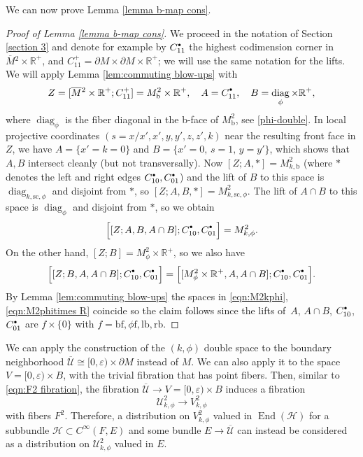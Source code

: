 \documentclass[JEP,XML,SOM,Unicode,NoFloatCountersInSection,published]{cedram}
\newcommand{\bbullet}{{\scriptscriptstyle\bullet}}
\newcommand{\sbullet}{{\raisebox{1pt}{$\bbullet$}}}
\theoremstyle{plain}
\theoremstyle{definition}
\newcommand{\R}{{\mathbb{R}}}
\newcommand{\Umath}{{\mathscr{U}}}
\newcommand{\Umathbar}{{\overline{\mathscr{U}}}}
\newcommand{\Hmath}{{\mathscr{H}}}
\newcommand{\phif}{{\phi\mathrm{f}}}
\newcommand{\lf}{{\mathrm{lb}}}
\newcommand{\rf}{{\mathrm{rb}}}
\newcommand{\bb}{{\mathrm{b}}}
\newcommand{\bbf}{{\mathrm{bf}}}
\newcommand{\ssc}{{\mathrm{sc}}}
\DeclareMathOperator\diag{diag}
\DeclareMathOperator{\End}{End}
\newcommand{\Cinf}{C^\infty}
\newcommand{\dM}{{\partial M}}
\newcommand{\Mbar}{{\overline{M}}}\let\M\Mbar
\let\eps\varepsilon
\begin{document}
We can now prove Lemma \ref{lemma b-map cons}.
\begin{proof} [Proof of Lemma \ref{lemma b-map cons}] We proceed in the notation of
Section \ref{section 3} and denote for example by $C_{11}^\sbullet$ the highest codimension corner in
$\Mbar{}^2 \times \R^+$, and $C_{11}^+ = \partial M\times\partial M\times \R^+$; we will use the same notation for the lifts.
We will apply
Lemma \ref{lem:commuting blow-ups} with
\[
Z=[\Mbar{}^2\times\R^+;C_{11}^+] = M^2_\bb\times\R^+, \quad
A=C_{11}^\sbullet, \quad B=\diag_\phi\times\R^+,
\]
where $\diag_\phi$ is the fiber diagonal in the b-face of $M^2_\bb$, see \eqref{phi-double}.
In local projective coordinates $(s=x/x', x', y,y',z,z',k)$ near the resulting front
face in $Z$, we have $A = \{x'=k=0\}$ and $B=\{x'=0,\, s=1,\, y=y'\}$, which shows that $A,B$ intersect cleanly {
(but not transversally).
Now $[Z;A,*]=M^2_{k,\bb}$ (where $*$ denotes the left and right edges $C_{10}^\sbullet,C_{01}^\sbullet$) and the lift of $B$ to this space is $\diag_{k,\ssc,\phi}$ and disjoint from $*$, so $[Z;A,B,*]= M^2_{k,\ssc,\phi}$. The lift of $A\cap B$ to this space is $\diag_\phi$ and disjoint from $*$, so we obtain}
\begin{equation}
\label{eqn:M2kphi}
\begin{split}
\Bigl[ [Z;A,B,A\cap B]; C_{10}^\sbullet,C_{01}^\sbullet\Bigr] = M^2_{k,\phi}.
\end{split}
\end{equation}
On the other hand, $[Z;B]=M^2_\phi\times\R^+$, so we also have
\begin{equation}
\label{eqn:M2phitimes R}
\Bigl[ [Z;B,A,A\cap B]; C_{10}^\sbullet,C_{01}^\sbullet\Bigr] = \Bigl[ [M^2_\phi \times \R^+,A,A\cap B]; C_{10}^\sbullet,C_{01}^\sbullet\Bigr].
\end{equation}
By Lemma \ref{lem:commuting blow-ups} the spaces in \eqref{eqn:M2kphi}, \eqref{eqn:M2phitimes R} coincide so the claim follows since the lifts of~$A$, $A\cap B$, $C_{10}^\sbullet$, $C_{01}^\sbullet$ are $f\times\{0\}$ with $f=\bbf, \phif, \lf,\rf$.
\end{proof}

We can apply the construction of the $(k,\phi)$ double space to the boundary neighborhood $\Umathbar\cong [0,\eps)\times\dM$ instead of $M$. We can also apply it to the space $V=[0,\eps)\times B$, with the trivial fibration that has point fibers. Then, similar to \eqref{eqn:F2 fibration}, the fibration $\Umathbar\to V=[0,\eps)\times B$ induces a fibration
\begin{equation}
\label{eqn:F2 fibration phi}
\Umath^2_{k,\phi} \to V^2_{k,\phi}
\end{equation}
with fibers $F^2$. Therefore, a distribution on $V^2_{k,\phi}$ valued in $\End(\Hmath)$ for a subbundle $\Hmath\subset \Cinf(F,E)$ and some bundle $E\to\Umathbar$ can instead be considered as a distribution on $\Umath^2_{k,\phi}$ valued in $E$.
\end{document}
